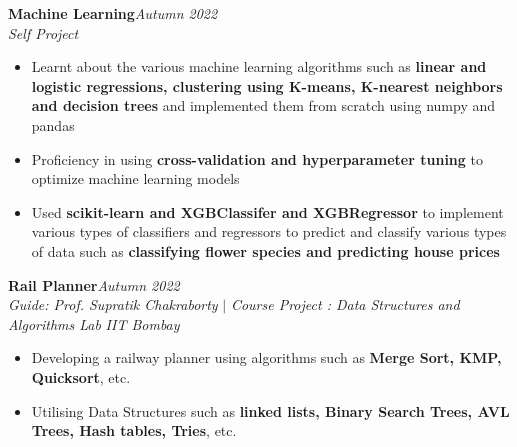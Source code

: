 \documentclass{article}
\begin{document}
\vspace{\baselineskip}
\vspace{-15pt}
\noindent\textbf{\large Machine Learning}\hfill{\sl \small Autumn 2022}\\
{\it Self Project}
\\\vspace{-17pt}
\begin{itemize}[itemsep = -1.4 mm, leftmargin=*]
    \item Learnt about the various machine learning algorithms such as \textbf{linear and logistic regressions, clustering using K-means, K-nearest neighbors and decision trees} and implemented them from scratch using numpy and pandas
    \item Proficiency in using \textbf{cross-validation and hyperparameter tuning} to optimize machine learning models
    \item Used \textbf{scikit-learn and XGBClassifer and XGBRegressor} to implement various types of classifiers and regressors to predict and classify various types of data such as \textbf{classifying flower species and predicting house prices}
\end{itemize}
\vspace{\baselineskip}
\vspace{-15pt}
\noindent\textbf{\large Rail Planner}\hfill{\sl \small Autumn 2022}\\
{\it Guide: Prof. Supratik Chakraborty} $|$ {\it Course Project : Data Structures and Algorithms Lab} \hfill{\it IIT Bombay}
\\\vspace{-17pt}
\begin{itemize}[itemsep = -1.4 mm, leftmargin=*]
    \item Developing a railway planner using algorithms such as \textbf{Merge Sort, KMP, Quicksort}, etc.
    \item Utilising Data Structures such as \textbf{linked lists, Binary Search Trees, AVL Trees, Hash tables, Tries}, etc.
\end{itemize}
\end{document}
